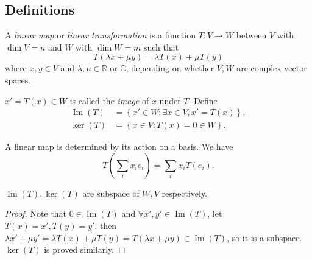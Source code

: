 \documentclass[10pt]{article}
\DeclareMathOperator{\im}{Im}
\begin{document}
    \subsection{Definitions}
    \begin{definition}
        A \textit{linear map} or \textit{linear transformation} is a function $ T:V\to W $ between $V$ with $\dim V=n$ and $W$ with $\dim W=m$ such that 
        \[
            T(\lambda x+ \mu y)=\lambda T(x)+\mu T(y)
        \]
        where $ x,y\in V $ and $ \lambda,\mu\in \mathbb{R}$ or $ \mathbb{C} $, depending on whether $V,W$ are complex vector spaces.

        $ x'=T(x)\in W $ is called the \textit{image} of $x$ under $T$. Define
        \[
            \begin{aligned}
                 \im(T)&=\left\{ x'\in W: \exists x\in V, x'=T(x)\right\},\\
                \ker(T)&=\left\{ x\in V:T(x)=0\in W\right\}.
            \end{aligned}    
        \]
    \end{definition}
    \begin{remark}
        A linear map is determined by its action on a basis. We have 
        \[
            T\left( \sum_{i}x_i e_i \right)=\sum_{i}x_i T(e_i)
        .\]
    \end{remark}
    \begin{lemma}\label{lma:ker,im subspace}
        $ \im(T),\ker(T) $ are subspace of $ W,V $ respectively.
    \end{lemma}
    \begin{proof}
        Note that $ 0\in \im(T) $ and $ \forall x',y'\in\im(T)  $, let $ T(x)=x',T(y)=y' $, then $  \lambda x'+\mu y'=\lambda T(x)+\mu T(y)=T(\lambda x+\mu y)\in \im(T) $, so it is a subspace. $\ker(T)$ is proved similarly.
    \end{proof}
\end{document}
